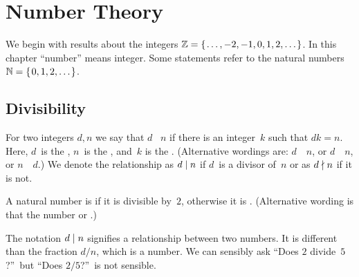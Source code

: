 \documentclass{ibl}  %
\begin{document}
    
\coverpage{}



\mainmatter
\pagestyle{bodypage}
\chapter{Number Theory}

We begin with results about the integers $\mathbb{Z}=\mbox{$\{\hspace{0.1em}\ldots,-2,-1,0,1,2,\ldots\hspace{0.1em}\}$}$.
In this chapter ``number'' means integer.
Some statements refer to the natural numbers $\mathbb{N}=\mbox{$\{\hspace{0.1em}0,1,2,\ldots\hspace{0.1em}\}$}$.


\section{Divisibility}

\begin{df}
  For two integers $d,n$ we say that
  $d$ ~$n$
  if there is an integer~$k$ such that $dk=n$.
  Here, $d$~is the , 
  $n$~is the ,
  and~$k$ is the .
  (Alternative wordings are:
  $d$~~$n$,
  or $d$~~$n$,
  or $n$~~$d$.)
  We denote the relationship as
  $d\mid n$ if $d$~is a divisor of~$n$
  or as $d\nmid n$ if it is not.
\end{df}

\begin{df}
  A natural number is  if it is divisible by~$2$,
  otherwise it is .
  (Alternative wording is that the number 
  or .)
\end{df}

The notation $d\mid n$ signifies a relationship between two numbers.
It is different than the fraction $d/n$, which is a number.
We can sensibly ask ``Does $2$ divide~$5$?''\
but ``Does $2/5$?''\ is not sensible.   
\end{document}
